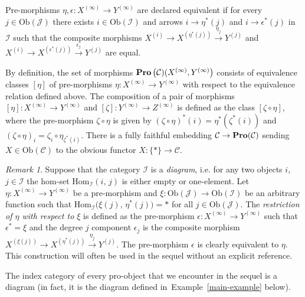 \documentclass[oneside, 11pt]{amsart}
\numberwithin{equation}{section}
\theoremstyle{definition}
\theoremstyle{definition}
\theoremstyle{remark}
\newtheorem{rem}[lemma]{Remark}
\newcommand{\catname}[1]{{\normalfont\textbf{#1}}} %
\begin{document}
Pre-morphisms $\eta, \epsilon \colon X^{(\infty)} \to Y^{(\infty)}$ are declared equivalent if for every $j \in \mathrm{Ob}(\mathcal{J})$ there exists $i \in \mathrm{Ob}(\mathcal{I})$ and arrows $i\rightarrow\eta^*(j)$ and $i\rightarrow\epsilon^*(j)$ in $\mathcal I$ such that the composite morphisms $X^{(i)} \to X^{(\eta^*(j))} \xrightarrow{\eta_j} Y^{(j)}$ and $X^{(i)} \to X^{(\epsilon^*(j))} \xrightarrow{\epsilon_j} Y^{(j)}$ are equal. 

By definition, the set of morphisms $\catname{Pro}\left(\mathcal{C})(X^{(\infty)}, Y^{(\infty)}\right)$ consists of equivalence classes $[\eta]$ of pre-morphisms $\eta \colon X^{(\infty)} \to Y^{(\infty)}$ with respect to the equivalence relation defined above. The composition of a pair of morphisms \([\eta] \colon X^{(\infty)} \to Y^{(\infty)}\) and \([\zeta] \colon Y^{(\infty)} \to Z^{(\infty)}\) is defined as the class $[\zeta \circ \eta]$, where the pre-morphism \(\zeta \circ \eta\) is given by \((\zeta \circ \eta)^*(i) = \eta^*(\zeta^*(i))\) and \((\zeta\circ \eta)_{i} = \zeta_{i} \circ \eta_{\zeta^*(i)}\). There is a fully faithful embedding $\mathcal{C}\to\catname{Pro}(\mathcal{C})$ sending $X \in \mathrm{Ob}(\mathcal{C})$ to the obvious functor $X\colon \{ * \} \to \mathcal{C}$. 

\begin{rem}
Suppose that the category $\mathcal{I}$ is a {\it diagram}, i.e. for any two objects $i$, $j\in\mathcal I$ the hom-set $\mathrm{Hom}_{\mathcal I}(i,\,j)$ is either empty or one-element. Let $\eta \colon X^{(\infty)} \to Y^{(\infty)}$ be a pre-morphism and $\xi\colon \mathrm{Ob}(\mathcal{J})\to\mathrm{Ob}(\mathcal{I})$ be an arbitrary function such that $\mathrm{Hom}_\mathcal{I}\big(\xi(j),\,\eta^*(j)\big)=*$ for all $j\in\mathrm{Ob}(\mathcal J)$. The {\it restriction of $\eta$ with respect to $\xi$} is defined as the pre-morphism $\epsilon\colon X^{(\infty)} \to Y^{(\infty)}$ such that $\epsilon^*=\xi$ and the degree $j$ component $\epsilon_j$ is the composite morphism $X^{(\xi(j))}\to X^{(\eta^*(j))}\xrightarrow{\eta_{j}}Y^{(j)}$. The pre-morphism $\epsilon$ is clearly equivalent to $\eta$. This construction will often be used in the sequel without an explicit reference.
  
The index category of every pro-object that we encounter in the sequel is a diagram (in fact, it is the diagram defined in~Example~\ref{main-example} below).
\end{rem}
\end{document}
